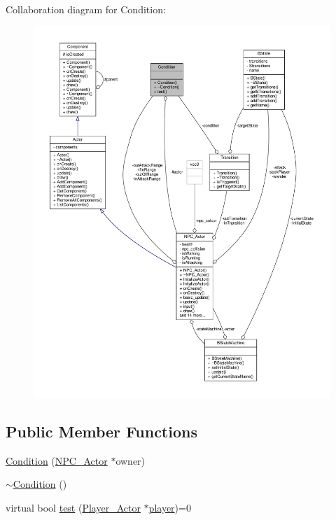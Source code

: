 Collaboration diagram for Condition\+:
\nopagebreak
\begin{figure}[H]
\begin{center}
\leavevmode
\includegraphics[width=350pt]{classCondition__coll__graph}
\end{center}
\end{figure}
\subsection*{Public Member Functions}
\begin{DoxyCompactItemize}
\item 
\hyperlink{classCondition_a85d4a561ea14b94cf86756a984936180}{Condition} (\hyperlink{classNPC__Actor}{N\+P\+C\+\_\+\+Actor} $\ast$owner)
\item 
\hyperlink{classCondition_ab42f6d2dfb2d0de4bed4ed5032d4a8fc}{$\sim$\+Condition} ()
\item 
virtual bool \hyperlink{classCondition_a4826569fb7c6f920884abb7583a081b6}{test} (\hyperlink{classPlayer__Actor}{Player\+\_\+\+Actor} $\ast$\hyperlink{game__play__state_8cpp_ac65a4bc85dcd7c1cefbc84425f42fc46}{player})=0
\end{DoxyCompactItemize}
